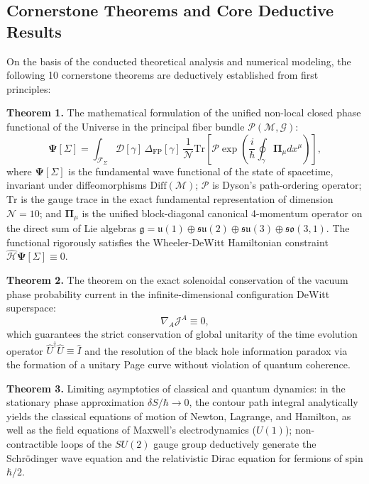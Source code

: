 \documentclass[11pt,a4paper]{article}
\theoremstyle{definition}
\begin{document}
\subsection{Cornerstone Theorems and Core Deductive Results}\label{subsec:cornerstone_theorems}

On the basis of the conducted theoretical analysis and numerical modeling, the following 10 cornerstone theorems are deductively established from first principles:

\textbf{Theorem 1.} The mathematical formulation of the unified non-local closed phase functional of the Universe in the principal fiber bundle $\mathcal{P}(\mathcal{M}, \mathcal{G})$:
\begin{equation}\label{eq:0.4}\tag{0.4}
\mathbf{\Psi}[\Sigma] = \int_{\mathcal{F}_\Sigma} \mathcal{D}[\gamma] \, \Delta_{\text{FP}}[\gamma] \, \frac{1}{\mathcal{N}} \text{Tr}\left[ \mathcal{P}\exp\left( \frac{i}{\hbar} \oint_\gamma \mathbf{\Pi}_\mu dx^\mu \right) \right],
\end{equation}
where $\mathbf{\Psi}[\Sigma]$ is the fundamental wave functional of the state of spacetime, invariant under diffeomorphisms $\text{Diff}(\mathcal{M})$; $\mathcal{P}$ is Dyson's path-ordering operator; $\text{Tr}$ is the gauge trace in the exact fundamental representation of dimension $\mathcal{N} = 10$; and $\mathbf{\Pi}_\mu$ is the unified block-diagonal canonical 4-momentum operator on the direct sum of Lie algebras $\mathfrak{g} = \mathfrak{u}(1) \oplus \mathfrak{su}(2) \oplus \mathfrak{su}(3) \oplus \mathfrak{so}(3,1)$. The functional rigorously satisfies the Wheeler-DeWitt Hamiltonian constraint $\hat{\mathcal{H}} \mathbf{\Psi}[\Sigma] \equiv 0$.

\textbf{Theorem 2.} The theorem on the exact solenoidal conservation of the vacuum phase probability current in the infinite-dimensional configuration DeWitt superspace:
\begin{equation}\label{eq:0.5}\tag{0.5}
\nabla_A \mathcal{J}^A \equiv 0,
\end{equation}
which guarantees the strict conservation of global unitarity of the time evolution operator $\hat{U}^\dagger \hat{U} \equiv \hat{I}$ and the resolution of the black hole information paradox via the formation of a unitary Page curve without violation of quantum coherence.

\textbf{Theorem 3.} Limiting asymptotics of classical and quantum dynamics: in the stationary phase approximation $\delta S / \hbar \to 0$, the contour path integral analytically yields the classical equations of motion of Newton, Lagrange, and Hamilton, as well as the field equations of Maxwell's electrodynamics ($U(1)$); non-contractible loops of the $SU(2)$ gauge group deductively generate the Schrödinger wave equation and the relativistic Dirac equation for fermions of spin $\hbar/2$.
\end{document}
